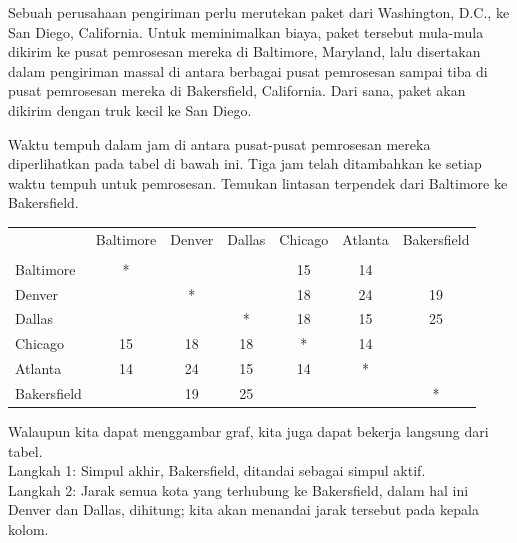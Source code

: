 \begin{example}{}
Sebuah perusahaan pengiriman perlu merutekan paket dari Washington, D.C., ke San Diego, California.  Untuk meminimalkan biaya, paket tersebut mula-mula dikirim ke pusat pemrosesan mereka di Baltimore, Maryland, lalu disertakan dalam pengiriman massal di antara berbagai pusat pemrosesan sampai tiba di pusat pemrosesan mereka di Bakersfield, California.  Dari sana, paket akan dikirim dengan truk kecil ke San Diego.  

Waktu tempuh dalam jam di antara pusat-pusat pemrosesan mereka diperlihatkan pada tabel di bawah ini.  Tiga jam telah ditambahkan ke setiap waktu tempuh untuk pemrosesan.  Temukan lintasan terpendek dari Baltimore ke Bakersfield.
 \begin{center}
 \begin{tabular}{|l|c|c|c|c|c|c|}
 \hline
 & Baltimore & Denver & Dallas & Chicago & Atlanta & Bakersfield\\
 &&&&&&\\
 \hline
 Baltimore & * &&&15&14&\\
 \hline
 Denver &&*&&18&24&19\\
 \hline
Dallas&&&*&18&15&25\\
 \hline
 Chicago &15&18&18&*&14&\\
 \hline
 Atlanta & 14 & 24&15&14&*&\\
 \hline
 Bakersfield &&19&25&&&*\\
 \hline
 \end{tabular}
\par{}\label{tab:graphtheory-dor1-tab01}%

 \end{center}

Walaupun kita dapat menggambar graf, kita juga dapat bekerja langsung dari tabel. \\

\noindent Langkah 1:  Simpul akhir, Bakersfield, ditandai sebagai simpul aktif.\\

\noindent Langkah 2:  Jarak semua kota yang terhubung ke Bakersfield, dalam hal ini Denver dan Dallas, dihitung; kita akan menandai jarak tersebut pada kepala kolom.  \\


\end{example}
